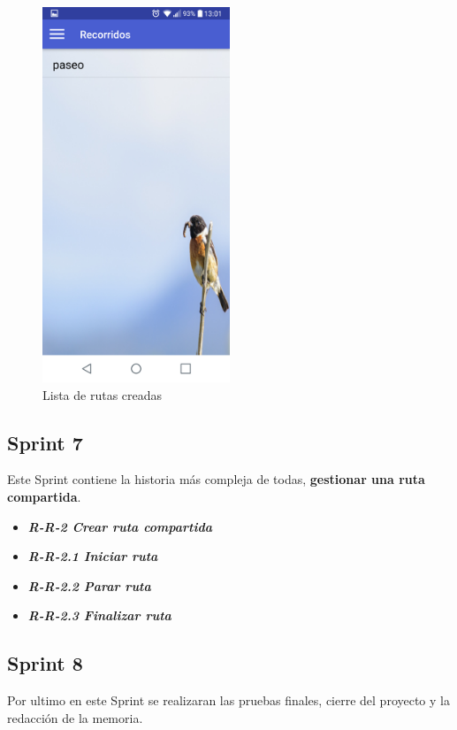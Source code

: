 \begin{figure}[htbp]
		\centering
		\includegraphics[width=0.5\textwidth] {capturamovil/listarutas}
		\caption{Lista de rutas creadas}
		 \label{fig:listarutas}
	\end{figure}
\newpage
\subsection{Sprint 7}
Este Sprint contiene la historia más compleja de todas,\textbf{ gestionar una ruta compartida}.

\begin{itemize}
\item \textbf{\textit{R-R-2 Crear ruta compartida}}
\item \textbf{\textit{R-R-2.1 Iniciar ruta}}
\item \textbf{\textit{R-R-2.2 Parar ruta}}
\item \textbf{\textit{R-R-2.3 Finalizar ruta}}
\end{itemize}










\subsection{Sprint 8}

Por ultimo en este Sprint se realizaran las pruebas finales, cierre del proyecto y la redacción de la memoria.

